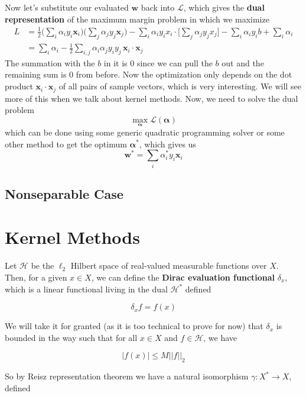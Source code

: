 \documentclass{article}
\theoremstyle{definition}
\begin{document}
  Now let's substitute our evaluated $\mathbf{w}$ back into $\mathcal{L}$, which gives the \textbf{dual representation} of the maximum margin problem in which we maximize  
  \begin{align*} 
      L & = \frac{1}{2} \bigg( \sum_i \alpha_i y_i \mathbf{x}_i \bigg) \bigg( \sum_j \alpha_j y_j \mathbf{x}_j \bigg) - \sum_{i} \alpha_i y_i x_i \cdot \bigg[ \sum_j \alpha_j y_j x_j \bigg] - \sum_i \alpha_i y_i b + \sum_i \alpha_i \\ 
        & = \sum_i \alpha_i - \frac{1}{2} \sum_{i, j} \alpha_i \alpha_j y_i y_j \, \mathbf{x}_i \cdot \mathbf{x}_j 
  \end{align*}
  The summation with the $b$ in it is $0$ since we can pull the $b$ out and the remaining sum is $0$ from before. Now the optimization only depends on the dot product $\mathbf{x}_i \cdot \mathbf{x}_j$ of all pairs of sample vectors, which is very interesting. We will see more of this when we talk about kernel methods. Now, we need to solve the dual problem 
  \[\max_{\boldsymbol{\alpha}} \mathcal{L}(\boldsymbol{\alpha})\]
  which can be done using some generic quadratic programming solver or some other method to get the optimum $\boldsymbol{\alpha}^\ast$, which gives us 
  \[\mathbf{w}^\ast = \sum_i \alpha_i^\ast y_i \mathbf{x}_i\]


  \subsection{Nonseparable Case} 

\section{Kernel Methods} 

  Let $\mathcal{H}$ be the $\ell_2$ Hilbert space of real-valued measurable functions over $X$. Then, for a given $x \in X$, we can define the \textbf{Dirac evaluation functional} $\delta_x$, which is a linear functional living in the dual $\mathcal{H}^\ast$ defined 

    \[\delta_x f = f(x)\]

  We will take it for granted (as it is too technical to prove for now) that $\delta_x$ is bounded in the way such that for all $x \in X$ and $f \in \mathcal{H}$, we have 

    \[|f(x)| \leq M ||f||_2 \]

  So by Reisz representation theorem we have a natural isomorphism $\gamma: X^\ast \rightarrow X$, defined 
\end{document}
